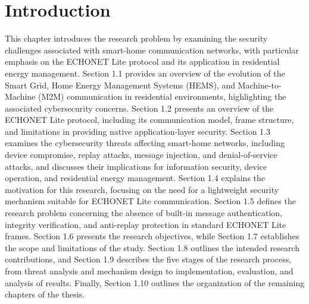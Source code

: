 \chapter{Introduction}\label{chap:intro}

This chapter introduces the research problem by examining the security challenges associated with smart-home communication networks, with particular emphasis on the ECHONET Lite protocol and its application in residential energy management. Section 1.1 provides an overview of the evolution of the Smart Grid, Home Energy Management Systems (HEMS), and Machine-to-Machine (M2M) communication in residential environments, highlighting the associated cybersecurity concerns. Section 1.2 presents an overview of the ECHONET Lite protocol, including its communication model, frame structure, and limitations in providing native application-layer security. Section 1.3 examines the cybersecurity threats affecting smart-home networks, including device compromise, replay attacks, message injection, and denial-of-service attacks, and discusses their implications for information security, device operation, and residential energy management. Section 1.4 explains the motivation for this research, focusing on the need for a lightweight security mechanism suitable for ECHONET Lite communication. Section 1.5 defines the research problem concerning the absence of built-in message authentication, integrity verification, and anti-replay protection in standard ECHONET Lite frames. Section 1.6 presents the research objectives, while Section 1.7 establishes the scope and limitations of the study. Section 1.8 outlines the intended research contributions, and Section 1.9 describes the five stages of the research process, from threat analysis and mechanism design to implementation, evaluation, and analysis of results. Finally, Section 1.10 outlines the organization of the remaining chapters of the thesis.



